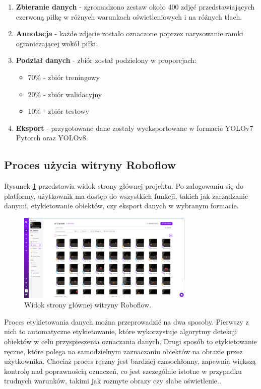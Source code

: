 \documentclass[a4paper,twoside,12pt]{book}
\begin{document}
\begin{enumerate}
	\item \textbf{Zbieranie danych} - zgromadzono zestaw około 400 zdjęć przedstawiających czerwoną piłkę w różnych warunkach oświetleniowych i na różnych tłach.
	
	\item \textbf{Annotacja} - każde zdjęcie zostało oznaczone poprzez narysowanie ramki ograniczającej wokół piłki.
		
	\item \textbf{Podział danych} - zbiór został podzielony w proporcjach:
	\begin{itemize}
		\item 70\% - zbiór treningowy
		\item 20\% - zbiór walidacyjny
		\item 10\% - zbiór testowy
	\end{itemize}
	
	\item \textbf{Eksport} - przygotowane dane zostały wyeksportowane w formacie YOLOv7 Pytorch oraz YOLOv8.
\end{enumerate}

\newpage

\subsection{Proces użycia witryny Roboflow}
Rysunek \ref{fig:roboflow-main} przedstawia widok strony głównej projektu. Po zalogowaniu się do platformy, użytkownik ma dostęp do wszystkich funkcji, takich jak zarządzanie danymi, etykietowanie obiektów, czy eksport danych w wybranym formacie.

\begin{figure}[h]
	\centering
	\includegraphics[width=0.75\textwidth]{Images/Roboflow/mainscreen.png}
	\caption{Widok strony głównej witryny Roboflow.}
	\label{fig:roboflow-main}
\end{figure}

Proces etykietowania danych można przeprowadzić na dwa sposoby. Pierwszy z nich to automatyczne etykietowanie, które wykorzystuje algorytmy detekcji obiektów w celu przyspieszenia oznaczania danych. Drugi sposób to etykietowanie ręczne, które polega na samodzielnym zaznaczaniu obiektów na obrazie przez użytkownika. Chociaż proces ręczny jest bardziej czasochłonny, zapewnia większą kontrolę nad poprawnością oznaczeń, co jest szczególnie istotne w przypadku trudnych warunków, takimi jak rozmyte obrazy czy słabe oświetlenie..
\end{document}
